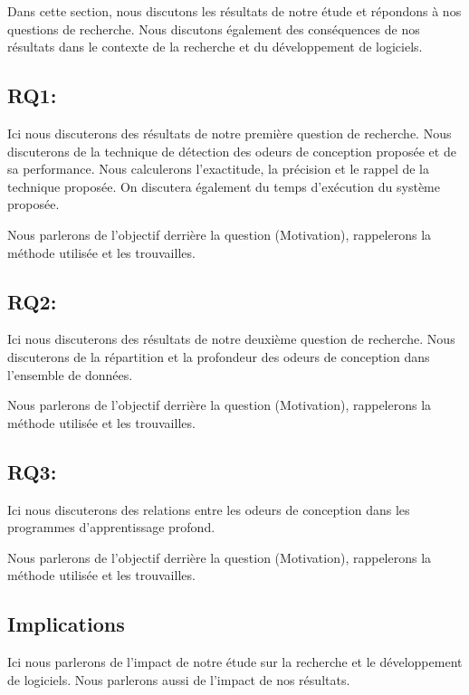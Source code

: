 \label{sec:discussion}
Dans cette section, nous discutons les résultats de notre étude et répondons à
nos questions de recherche. Nous discutons également des conséquences de nos
résultats dans le contexte de la recherche et du développement de logiciels.

\subsection{RQ1:\RQOne}
\label{rq1}

Ici nous discuterons des résultats de notre première question de recherche. Nous
discuterons de la technique de détection des odeurs de conception proposée et de
sa performance. Nous calculerons l'exactitude, la précision et le rappel de la technique
proposée. On discutera également du temps d'exécution du système proposée.

Nous parlerons de l'objectif derrière la question (Motivation), rappelerons la
méthode utilisée et les trouvailles.





\subsection{RQ2:\RQTwo}
\label{rq2}

Ici nous discuterons des résultats de notre deuxième question de recherche. Nous
discuterons de la répartition et la profondeur des odeurs de conception dans
l'ensemble de données.


Nous parlerons de l'objectif derrière la question (Motivation), rappelerons la
méthode utilisée et les trouvailles.



\subsection{RQ3:\RQThree}
\label{rq3}

Ici nous discuterons des relations entre les odeurs de conception dans les
programmes d'apprentissage profond.

Nous parlerons de l'objectif derrière la question (Motivation), rappelerons la
méthode utilisée et les trouvailles.






\subsection{Implications}
\label{implications}
Ici nous parlerons de l'impact de notre étude sur la recherche et le
développement de logiciels. Nous parlerons aussi de l'impact de nos résultats.




